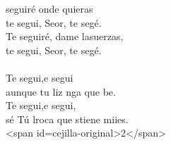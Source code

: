 \begin{cancion}[Te seguiré][Ixcís]%
	seguiré onde quieras\\
	te segui, Seor, te segé. \\
	Te seguiré, dame lasuerzas,\\
	te segui, Seor, te segé. \\
\jump\\
	Te segui,e segui \\
	aunque tu liz nga que be. \\
	Te segui,e segui, \\
	sé Tú lroca que stiene miies.\\
<span id=cejilla-original>2</span>\\
\end{cancion}%
